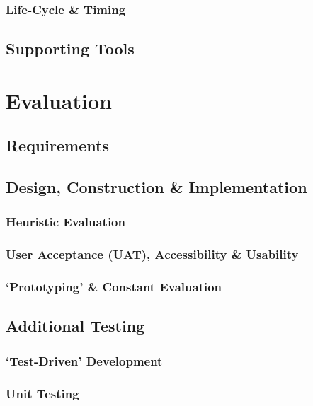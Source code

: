 \documentclass[11pt, english]{article}
\begin{document}
		\subsubsection{Life-Cycle \& Timing}

		\subsection{Supporting Tools}

\newpage

\section{Evaluation}\label{ch7}

	\subsection{Requirements}

	\subsection{Design, Construction \& Implementation}

		\subsubsection{Heuristic Evaluation}

		\subsubsection{User Acceptance (UAT), Accessibility \& Usability}

		\subsubsection{`Prototyping' \& Constant Evaluation}

	\subsection{Additional Testing}

		\subsubsection{`Test-Driven' Development}

		\subsubsection{Unit Testing}
\end{document}
